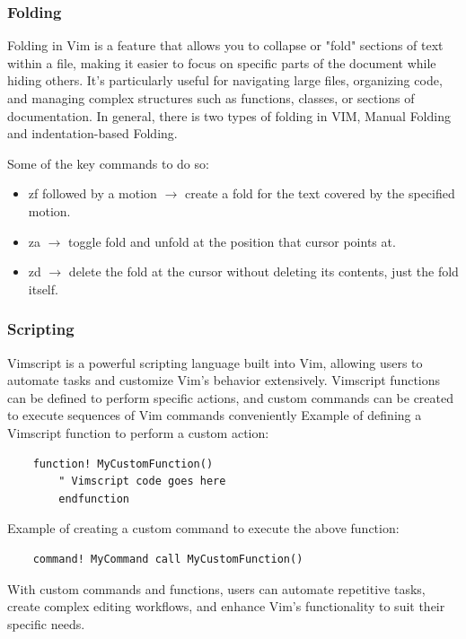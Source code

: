 \documentclass[12pt]{article}
\begin{document}
	\subsubsection{Folding}
	Folding in Vim is a feature that allows you to collapse or "fold" sections of text within a file, making it easier to focus on specific parts of the document while hiding others.
	It's particularly useful for navigating large files, organizing code, and managing complex structures such as functions, classes, or sections of documentation.
	In general, there is two types of folding in VIM, Manual Folding and indentation-based Folding.

	Some of the key commands to do so:
	\begin{itemize}
		\item zf followed by a motion $\rightarrow$ create a fold for the text covered by the specified motion.
		\item za $\rightarrow$ toggle fold and unfold at the position that cursor points at.
		\item zd $\rightarrow$ delete the fold at the cursor without deleting its contents, just the fold itself.
	\end{itemize}

	\subsubsection{Scripting}
	Vimscript is a powerful scripting language built into Vim, allowing users to automate tasks and customize Vim's behavior extensively.
	Vimscript functions can be defined to perform specific actions, and custom commands can be created to execute sequences of Vim commands conveniently
	Example of defining a Vimscript function to perform a custom action:

	\begin{lstlisting}
	function! MyCustomFunction()
    	" Vimscript code goes here
		endfunction
	\end{lstlisting}

	Example of creating a custom command to execute the above function:

	\begin{lstlisting}
	command! MyCommand call MyCustomFunction()
	\end{lstlisting}


	With custom commands and functions, users can automate repetitive tasks, create complex editing workflows, and enhance Vim's functionality to suit their specific needs.
\end{document}
